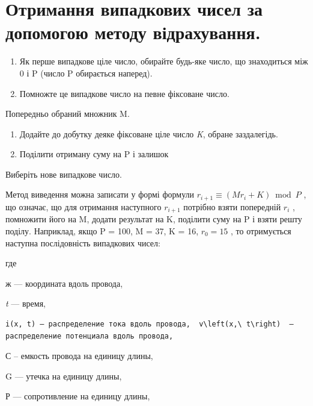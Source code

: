 \documentclass[
  ukrainian,
]{article}
\begin{document}
\section{Отримання випадкових чисел за допомогою методу
відрахування.}\label{ux43eux442ux440ux438ux43cux430ux43dux43dux44f-ux432ux438ux43fux430ux434ux43aux43eux432ux438ux445-ux447ux438ux441ux435ux43b-ux437ux430-ux434ux43eux43fux43eux43cux43eux433ux43eux44e-ux43cux435ux442ux43eux434ux443-ux432ux456ux434ux440ux430ux445ux443ux432ux430ux43dux43dux44f.}

\begin{enumerate}
\def\labelenumi{\arabic{enumi}.}
\item
  Як перше випадкове ціле число, обирайте будь-яке число, що знаходиться
  між 0 і P (число P обирається наперед).
\item
  Помножте це випадкове число на певне фіксоване число.
\end{enumerate}

Попередньо обраний множник M.

\begin{enumerate}
\def\labelenumi{\arabic{enumi}.}
\setcounter{enumi}{2}
\item
  Додайте до добутку деяке фіксоване ціле число \emph{K}, обране
  заздалегідь.
\item
  Поділити отриману суму на P і залишок
\end{enumerate}

Виберіть нове випадкове число.

Метод виведення можна записати у формі формули
\(r_{i+1} \equiv (Mr_i + K) \bmod P\) , що означає, що для отримання
наступного \(r_{i+1}\) потрібно взяти попередній \(r_i\) , помножити
його на M, додати результат на K, поділити суму на P і взяти решту
поділу. Наприклад, якщо P = 100, M = 37, K = 16, \(r_0 = 15\) , то
отримується наступна послідовність випадкових чисел:

где

ж --- координата вдоль провода,

\emph{t} --- время,

\begin{verbatim}
i(x, t) — распределение тока вдоль провода,  v\left(x,\ t\right)  — распределение потенциала вдоль провода,
\end{verbatim}

С -- емкость провода на единицу длины,

G --- утечка на единицу длины,

Р --- сопротивление на единицу длины,
\end{document}
